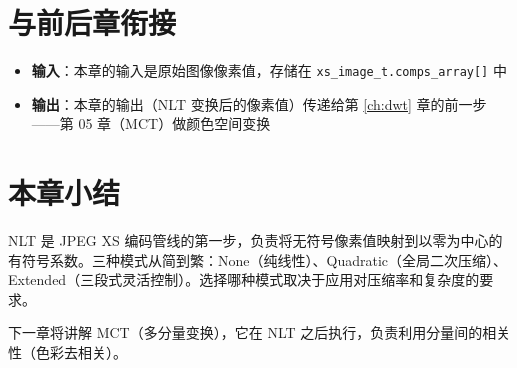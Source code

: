\section{与前后章衔接}

\begin{itemize}
  \item \textbf{输入}：本章的输入是原始图像像素值，存储在 \texttt{xs\_image\_t.comps\_array[]} 中
  \item \textbf{输出}：本章的输出（NLT 变换后的像素值）传递给第 \ref{ch:dwt} 章的前一步——第 05 章（MCT）做颜色空间变换
\end{itemize}

\section{本章小结}

NLT 是 JPEG XS 编码管线的第一步，负责将无符号像素值映射到以零为中心的有符号系数。三种模式从简到繁：None（纯线性）、Quadratic（全局二次压缩）、Extended（三段式灵活控制）。选择哪种模式取决于应用对压缩率和复杂度的要求。

下一章将讲解 MCT（多分量变换），它在 NLT 之后执行，负责利用分量间的相关性（色彩去相关）。
